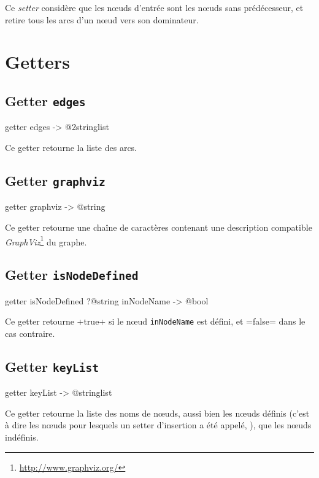 Ce \emph{setter} considère que les nœuds d'entrée sont les nœuds sans prédécesseur, et retire tous les arcs d'un nœud vers son dominateur.

\section{Getters}

\subsection{Getter \texttt{edges}}

\begin{galgas3}
getter edges -> @2stringlist
\end{galgas3}

Ce getter retourne la liste des arcs.


\subsection{Getter \texttt{graphviz}}

\begin{galgas3}
getter graphviz -> @string
\end{galgas3}

Ce getter retourne une chaîne de caractères contenant une description compatible \emph{GraphViz}\footnote{\url{http://www.graphviz.org/}} du graphe.



\subsection{Getter \texttt{isNodeDefined}}

\begin{galgas3}
getter isNodeDefined ?@string inNodeName -> @bool
\end{galgas3}

Ce getter retourne \ggst+true+ si le nœud \texttt{inNodeName} est défini, et \ggst=false= dans le cas contraire.


\subsection{Getter \texttt{keyList}}

\begin{galgas3}
getter keyList -> @stringlist
\end{galgas3}

Ce getter retourne la liste des noms de nœuds, aussi bien les nœuds définis (c'est à dire les nœuds pour lesquels un setter d'insertion a été appelé, ), que les nœuds indéfinis.



